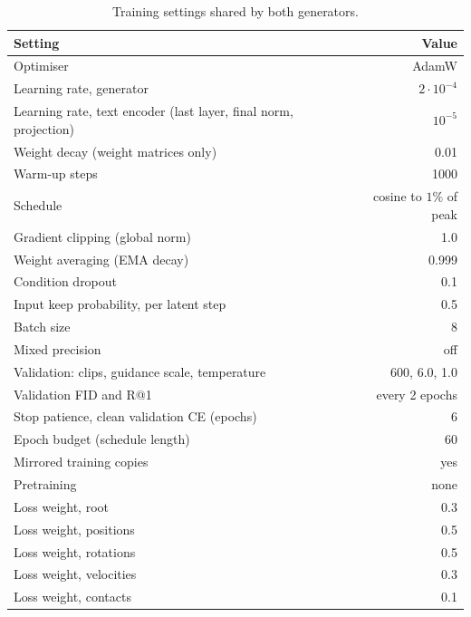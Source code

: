 \begin{table}[H]
\centering
\caption{Training settings shared by both generators.}
\label{tab:app_train}
\begin{tabular}{lr}
\toprule
Setting & Value \\
\midrule
Optimiser & AdamW \\
Learning rate, generator & $2 \cdot 10^{-4}$ \\
Learning rate, text encoder (last layer, final norm, projection) & $10^{-5}$ \\
Weight decay (weight matrices only) & 0.01 \\
Warm-up steps & 1000 \\
Schedule & cosine to $1\%$ of peak \\
Gradient clipping (global norm) & 1.0 \\
Weight averaging (EMA decay) & 0.999 \\
Condition dropout & 0.1 \\
Input keep probability, per latent step & 0.5 \\
Batch size & 8 \\
Mixed precision & off \\
Validation: clips, guidance scale, temperature & 600, 6.0, 1.0 \\
Validation FID and R@1 & every 2 epochs \\
Stop patience, clean validation CE (epochs) & 6 \\
Epoch budget (schedule length) & 60 \\
Mirrored training copies & yes \\
Pretraining & none \\
\midrule
Loss weight, root & 0.3 \\
Loss weight, positions & 0.5 \\
Loss weight, rotations & 0.5 \\
Loss weight, velocities & 0.3 \\
Loss weight, contacts & 0.1 \\
\bottomrule
\end{tabular}
\end{table}

